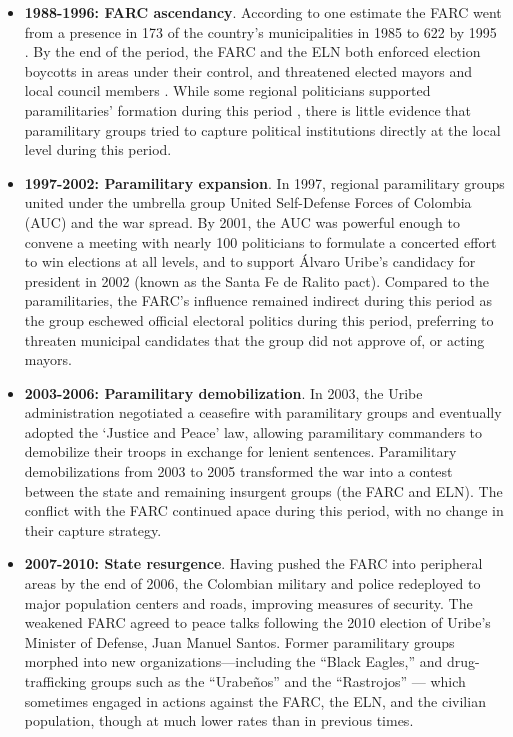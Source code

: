 \begin{itemize}

\item \textbf{1988-1996: FARC ascendancy}. 
According to one estimate the FARC went from a presence in 173 of the country's municipalities in 1985 to 622 by 1995 \citep[28]{echandia06a}. 
By the end of the period, the FARC and the ELN both enforced election boycotts in areas under their control, and threatened elected mayors and local council members \citep{el-tiempo97a}. 
While some regional politicians supported paramilitaries' formation during this period \citep[37]{ronderos14a}, there is little evidence that paramilitary groups tried to capture political institutions directly at the local level during this period.

\item \textbf{1997-2002: Paramilitary expansion}. 
In 1997, regional paramilitary groups united under the umbrella group United Self-Defense Forces of Colombia (AUC) and the war spread. By 2001, the AUC was powerful enough to convene a meeting with nearly 100 politicians to formulate a concerted effort to win elections at all levels, and to support \'Alvaro Uribe's candidacy for president in 2002 (known as the Santa Fe de Ralito pact). Compared to the paramilitaries, the FARC's influence remained indirect during this period as the group eschewed official electoral politics during this period, preferring to threaten municipal candidates that the group did not approve of, or acting mayors.

\item \textbf{2003-2006: Paramilitary demobilization}.
In 2003, the Uribe administration negotiated a ceasefire with paramilitary groups and eventually adopted the `Justice and Peace' law, allowing paramilitary commanders to demobilize their troops in exchange for lenient sentences. Paramilitary demobilizations from 2003 to 2005 transformed the war into a contest between the state and remaining insurgent groups (the FARC and ELN). The conflict with the FARC continued apace during this period, with no change in their capture strategy.

\item \textbf{2007-2010: State resurgence}.
Having pushed the FARC into peripheral areas by the end of 2006, the Colombian military and police redeployed to major population centers and roads, improving measures of security. The weakened FARC agreed to peace talks following the 2010 election of Uribe's Minister of Defense, Juan Manuel Santos. Former paramilitary groups morphed into new organizations---including the ``Black Eagles,'' and drug-trafficking groups such as the ``Urabe\~{n}os'' and the ``Rastrojos'' — which sometimes engaged in actions against the FARC, the ELN, and the civilian population, though at much lower rates than in previous times.

\end{itemize}

